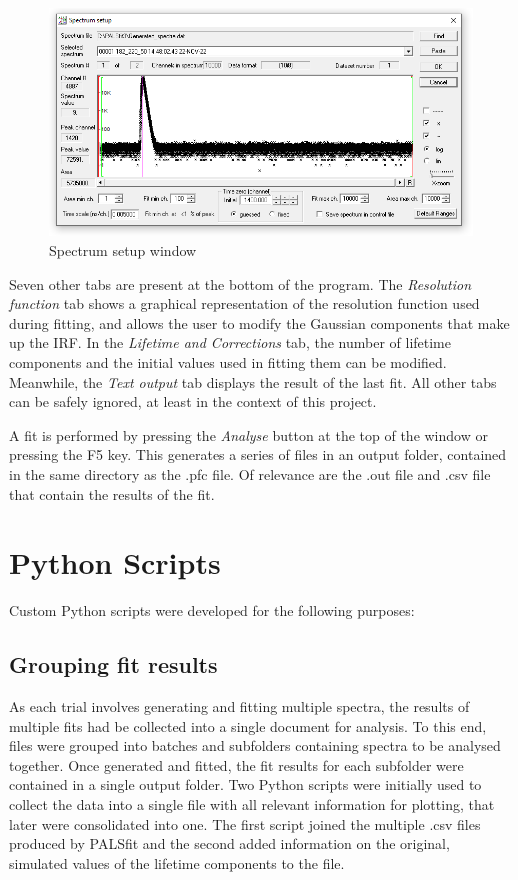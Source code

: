 \vfill

\begin{figure}[h]
    \centering
    \includegraphics[width=0.6\linewidth]{SpecSetup.PNG}
    \caption{Spectrum setup window}
    \label{fig:SpecSet}
\end{figure}

Seven other tabs are present at the bottom of the program. The \textit{Resolution function} tab shows a graphical representation of the resolution function used during fitting, and allows the user to modify the Gaussian components that make up the IRF. In the \textit{Lifetime and Corrections} tab, the number of lifetime components and the initial values used in fitting them can be modified. Meanwhile, the \textit{Text output} tab displays the result of the last fit. All other tabs can be safely ignored, at least in the context of this project.

A fit is performed by pressing the \textit{Analyse} button at the top of the window or pressing the F5 key. This generates a series of files in an output folder, contained in the same directory as the .pfc file. Of relevance are the .out file and .csv file that contain the results of the fit.

\section{Python Scripts}

Custom Python scripts were developed for the following purposes:

\subsection{Grouping fit results}
As each trial involves generating and fitting multiple spectra, the results of multiple fits had be collected into a single document for analysis. To this end, files were grouped into batches and subfolders containing spectra to be analysed together. Once generated and fitted, the fit results for each subfolder were contained in a single output folder. Two Python scripts were initially used to collect the data into a single file with all relevant information for plotting, that later were consolidated into one. The first script joined the multiple .csv files produced by PALSfit and the second added information on the original, simulated values of the lifetime components to the file.

